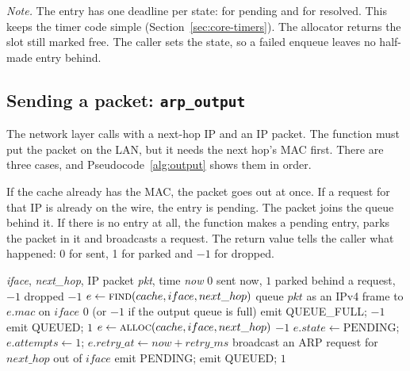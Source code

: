 \emph{Note.} The entry has one deadline per state:  for pending and  for resolved. This keeps the timer code simple (Section~\ref{sec:core-timers}). The allocator returns the slot still marked free. The caller sets the state, so a failed enqueue leaves no half-made entry behind.

\subsection{Sending a packet: \texttt{arp\_output}}\label{sec:core-output}
The network layer calls  with a next-hop IP and an IP packet. The function must put the packet on the LAN, but it needs the next hop's MAC first. There are three cases, and Pseudocode~\ref{alg:output} shows them in order.

If the cache already has the MAC, the packet goes out at once. If a request for that IP is already on the wire, the entry is pending. The packet joins the queue behind it. If there is no entry at all, the function makes a pending entry, parks the packet in it and broadcasts a request. The return value tells the caller what happened: 0 for sent, 1 for parked and $-1$ for dropped.

\begin{algorithm}[H]\small
\caption{Send path ()}
\label{alg:output}
\begin{algorithmic}[1]
\Require \textit{iface}, \textit{next\_hop}, IP packet \textit{pkt}, time \textit{now}
\Ensure $0$ sent now, $1$ parked behind a request, $-1$ dropped
 \Return $-1$
\EndIf
\State $e \gets \textsc{find}(cache, iface, next\_hop)$
 
  \State queue $pkt$ as an IPv4 frame to $e.mac$ on $iface$
  \State \Return $0$ (or $-1$ if the output queue is full)
\EndIf
{} 
    \State emit QUEUE\_FULL; \Return $-1$
  \EndIf
  \State emit QUEUED; \Return $1$
\EndIf
\State $e \gets \textsc{alloc}(cache, iface, next\_hop)$ 
 \Return $-1$
\EndIf
\State $e.state \gets \text{PENDING}$; $e.attempts \gets 1$; $e.retry\_at \gets now + retry\_ms$
\State broadcast an ARP request for $next\_hop$ out of $iface$
\State emit PENDING; emit QUEUED; \Return $1$
\end{algorithmic}
\end{algorithm}


